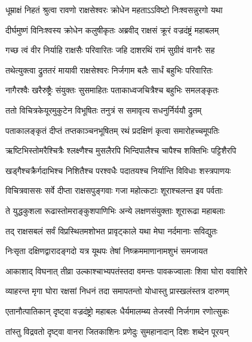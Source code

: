 
\twolineshloka
{धूम्राक्षं निहतं श्रुत्वा रावणो राक्षसेश्वरः}
{क्रोधेन महताऽऽविष्टो निःश्वसन्नुरगो यथा} %

\twolineshloka
{दीर्घमुष्णं विनिःश्वस्य क्रोधेन कलुषीकृतः}
{अब्रवीद् राक्षसं क्रूरं वज्रदंष्ट्रं महाबलम्} %

\twolineshloka
{गच्छ त्वं वीर निर्याहि राक्षसैः परिवारितः}
{जहि दाशरथिं रामं सुग्रीवं वानरैः सह} %

\twolineshloka
{तथेत्युक्त्वा द्रुततरं मायावी राक्षसेश्वरः}
{निर्जगाम बलैः सार्धं बहुभिः परिवारितः} %

\twolineshloka
{नागैरश्वैः खरैरुष्ट्रैः संयुक्तः सुसमाहितः}
{पताकाध्वजचित्रैश्च बहुभिः समलङ्कृतः} %

\twolineshloka
{ततो विचित्रकेयूरमुकुटेन विभूषितः}
{तनुत्रं स समावृत्य सधनुर्निर्ययौ द्रुतम्} %

\twolineshloka
{पताकालङ्कृतं दीप्तं तप्तकाञ्चनभूषितम्}
{रथं प्रदक्षिणं कृत्वा समारोहच्चमूपतिः} %

\twolineshloka
{ऋष्टिभिस्तोमरैश्चित्रैः श्लक्ष्णैश्च मुसलैरपि}
{भिन्दिपालैश्च चापैश्च शक्तिभिः पट्टिशैरपि} %

\twolineshloka
{खड्गैश्चक्रैर्गदाभिश्च निशितैश्च परश्वधैः}
{पदातयश्च निर्यान्ति विविधाः शस्त्रपाणयः} %

\twolineshloka
{विचित्रवाससः सर्वे दीप्ता राक्षसपुङ्गवाः}
{गजा महोत्कटाः शूराश्चलन्त इव पर्वताः} %

\twolineshloka
{ते युद्धकुशला रूढास्तोमराङ्कुशपाणिभिः}
{अन्ये लक्षणसंयुक्ताः शूरारूढा महाबलाः} %

\twolineshloka
{तद् राक्षसबलं सर्वं विप्रस्थितमशोभत}
{प्रावृट्काले यथा मेघा नर्दमानाः सविद्युतः} %

\twolineshloka
{निःसृता दक्षिणद्वारादङ्गदो यत्र यूथपः}
{तेषां निष्क्रममाणानामशुभं समजायत} %

\twolineshloka
{आकाशाद् विघनात् तीव्रा उल्काश्चाभ्यपतंस्तदा}
{वमन्तः पावकज्वालाः शिवा घोरा ववाशिरे} %

\twolineshloka
{व्याहरन्त मृगा घोरा रक्षसां निधनं तदा}
{समापतन्तो योधास्तु प्रास्खलंस्तत्र दारुणम्} %

\twolineshloka
{एतानौत्पातिकान् दृष्ट्वा वज्रदंष्ट्रो महाबलः}
{धैर्यमालम्ब्य तेजस्वी निर्जगाम रणोत्सुकः} %

\twolineshloka
{तांस्तु विद्रवतो दृष्ट्वा वानरा जितकाशिनः}
{प्रणेदुः सुमहानादान् दिशः शब्देन पूरयन्} %

